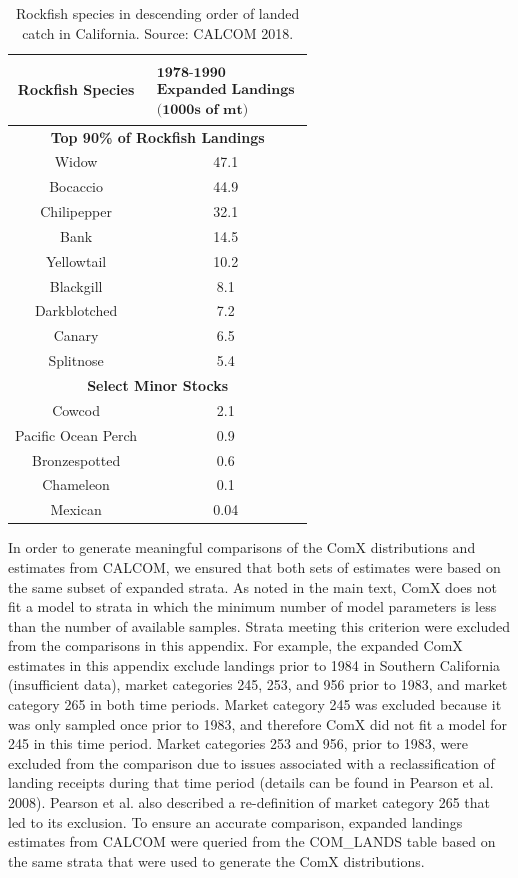 \documentclass[12pt]{article}
\begin{document}
%
\begin{table}[h!]
\centering
\begin{tabular}{cc}
\hline
\textbf{Rockfish Species}	& $\substack{\\\textbf{1978-1990}\\\textbf{Expanded Landings}\\\textbf{(1000s of mt)}}$\\ \hline
\multicolumn{2}{c}{\textbf{Top 90\% of Rockfish Landings}}\\ \hline
Widow			& 47.1 \\
Bocaccio		& 44.9 \\
Chilipepper		& 32.1 \\
Bank			& 14.5 \\
Yellowtail		& 10.2 \\
Blackgill		& 8.1  \\
Darkblotched		& 7.2  \\
Canary			& 6.5  \\
Splitnose		& 5.4  \\ \hline
\multicolumn{2}{c}{\textbf{Select Minor Stocks}}\\ \hline
Cowcod			& 2.1  \\
Pacific Ocean Perch	& 0.9  \\
Bronzespotted		& 0.6  \\
Chameleon		& 0.1  \\
Mexican			& 0.04 \\ \hline
\end{tabular}
\caption{Rockfish species in descending order of landed catch in 
California. Source: CALCOM 2018.}
\label{ejTab1}
\end{table}

In order to generate meaningful comparisons of the ComX distributions and 
estimates from CALCOM, we ensured that both sets of estimates were based on 
the same subset of expanded strata. As noted in the main text, ComX does not 
fit a model to strata in which the minimum number of model parameters is less 
than the number of available samples. Strata meeting this criterion were 
excluded from the comparisons in this appendix. For example, the expanded ComX 
estimates in this appendix exclude landings prior to 1984 in Southern 
California (insufficient data), market categories 245, 253, and 956 prior to 
1983, and market category 265 in both time periods. Market category 245 was 
excluded because it was only sampled once prior to 1983, and therefore ComX 
did not fit a model for 245 in this time period. Market categories 253 and 
956, prior to 1983, were excluded from the comparison due to issues associated 
with a reclassification of landing receipts during that time period (details 
can be found in Pearson et al. 2008). Pearson et al. also described a 
re-definition of market category 265 that led to its exclusion. To ensure an 
accurate comparison, expanded landings estimates from CALCOM were queried from 
the COM\_LANDS table based on the same strata that were used to generate the 
ComX distributions.
\end{document}
